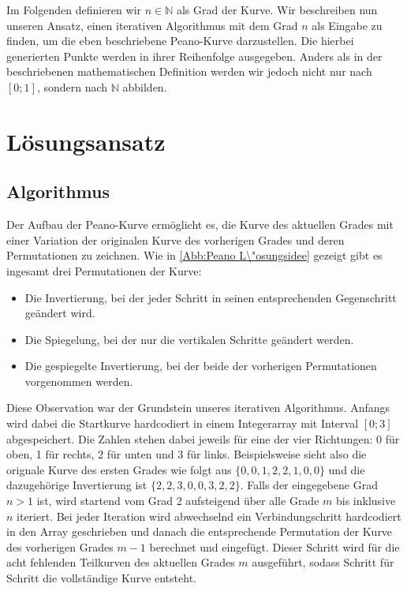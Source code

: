 \documentclass[course=asp]{aspdoc}
\begin{document}
Im Folgenden definieren wir $n \in \mathbb{N}$ als Grad der Kurve.
Wir beschreiben nun unseren Ansatz, einen iterativen Algorithmus mit dem Grad $n$ als Eingabe zu finden, um die eben beschriebene Peano-Kurve darzustellen. Die hierbei generierten Punkte werden in ihrer Reihenfolge ausgegeben. Anders als in der beschriebenen mathematischen Definition werden wir jedoch nicht nur nach $[0;1]$, sondern nach $\mathbb{N}$ abbilden.


\newpage

\section{L\"osungsansatz} \label{L\"osungsansatz}

\subsection{Algorithmus} \label{Algorithmus}

Der Aufbau der Peano-Kurve erm\"oglicht es, die Kurve des aktuellen Grades mit einer Variation der originalen Kurve des vorherigen Grades und deren Permutationen zu zeichnen. Wie in \ref{Abb:Peano L\"osungsidee} gezeigt gibt es ingesamt drei Permutationen der Kurve:

\begin{itemize}
    \item Die Invertierung, bei der jeder Schritt in seinen entsprechenden Gegenschritt ge\"andert wird.
    \item Die Spiegelung, bei der nur die vertikalen Schritte ge\"andert werden.
    \item Die gespiegelte Invertierung, bei der beide der vorherigen Permutationen vorgenommen werden.
\end{itemize}

Diese Observation war der Grundstein unseres iterativen Algorithmus. Anfangs wird dabei die Startkurve hardcodiert in einem Integerarray mit Interval $[0;3]$ abgespeichert. Die Zahlen stehen dabei jeweils f\"ur eine der vier Richtungen: 0 f\"ur oben, 1 f\"ur rechts, 2 f\"ur unten und 3 f\"ur links. Beispielsweise sieht also die orignale Kurve des ersten Grades wie folgt aus $\{0, 0, 1, 2, 2, 1, 0, 0\}$ und die dazugeh\"orige Invertierung ist $\{2, 2, 3, 0, 0, 3, 2, 2\}$. 
Falls der eingegebene Grad $n > 1$ ist, wird startend vom Grad 2 aufsteigend \"uber alle Grade $m$ bis inklusive $n$ iteriert. Bei jeder Iteration wird abwechselnd ein Verbindungschritt hardcodiert in den Array geschrieben und danach die entsprechende Permutation der Kurve des vorherigen Grades $m - 1$ berechnet und eingef\"ugt. Dieser Schritt wird f\"ur die acht fehlenden Teilkurven des aktuellen Grades $m$ ausgef\"uhrt, sodass Schritt f\"ur Schritt die vollst\"andige Kurve entsteht.
\end{document}
